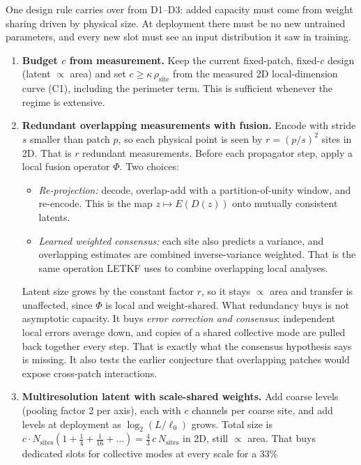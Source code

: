 \documentclass[11pt]{article}
\begin{document}
One design rule carries over from D1--D3: added capacity must come from
weight sharing driven by physical size. At deployment there must be no
new untrained parameters, and every new slot must see an input
distribution it saw in training.
\begin{enumerate}[leftmargin=*]
\item \textbf{Budget $c$ from measurement.} Keep the current
  fixed-patch, fixed-$c$ design (latent $\propto$ area) and set
  $c\ge\kappa\,\rho_{\mathrm{site}}$ from the measured 2D local-dimension
  curve (C1), including the perimeter term. This is sufficient whenever
  the regime is extensive.
\item \textbf{Redundant overlapping measurements with fusion.} Encode with
  stride $s$ smaller than patch $p$, so each physical point is seen by
  $r=(p/s)^2$ sites in 2D. That is $r$ redundant measurements. Before
  each propagator step, apply a local fusion operator $\Phi$. Two
  choices:
  \begin{itemize}[leftmargin=*]
  \item \emph{Re-projection:} decode, overlap-add with a partition-of-unity
    window, and re-encode. This is the map $z\mapsto E(D(z))$ onto
    mutually consistent latents.
  \item \emph{Learned weighted consensus:} each site also predicts a
    variance, and overlapping estimates are combined inverse-variance
    weighted. That is the same operation LETKF uses to combine
    overlapping local analyses.
  \end{itemize}
  Latent size grows by the constant factor $r$, so it stays $\propto$
  area and transfer is unaffected, since $\Phi$ is local and
  weight-shared. What redundancy buys is not asymptotic capacity. It buys
  \emph{error correction and consensus}: independent local errors average
  down, and copies of a shared collective mode are pulled back together
  every step. That is exactly what the consensus hypothesis says is
  missing. It also tests the earlier conjecture that overlapping patches
  would expose cross-patch interactions.
\item \textbf{Multiresolution latent with scale-shared weights.} Add
  coarse levels (pooling factor 2 per axis), each with $c$ channels per
  coarse site, and add levels at deployment as $\log_2(L/\ell_0)$ grows.
  Total size is $c\cdot N_{\mathrm{sites}}(1+\tfrac14+\tfrac1{16}+\dots) =
  \tfrac43\,c\,N_{\mathrm{sites}}$ in 2D, still $\propto$ area. That buys
  dedicated slots for collective modes at every scale for a 33\%

\end{enumerate}
\end{document}
